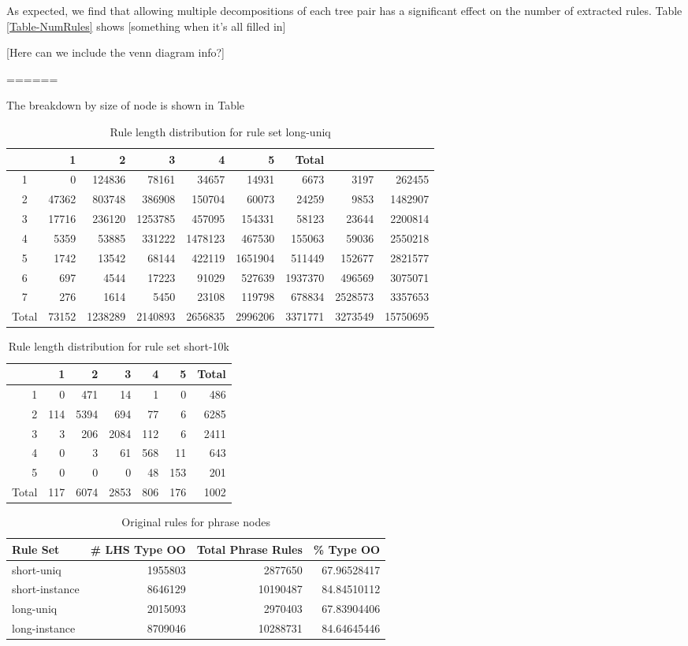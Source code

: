 \documentclass[11pt]{article}
\begin{document}
As expected, we find that allowing multiple decompositions of each tree pair has a significant effect on the number of extracted rules.  Table \ref{Table-NumRules} shows [something when it's all filled in]

[Here can we include the venn diagram info?]

======

The breakdown by size of node is shown in Table

\begin{table}
\begin{tabular}{c|rrrrrrr|r}
&1&2&3&4&5&Total\\
\hline
1&0&124836&78161&34657&14931&6673&3197&262455\\
2&47362&803748&386908&150704&60073&24259&9853&1482907\\
3&17716&236120&1253785&457095&154331&58123&23644&2200814\\
4&5359&53885&331222&1478123&467530&155063&59036&2550218\\
5&1742&13542&68144&422119&1651904&511449&152677&2821577\\
6&697&4544&17223&91029&527639&1937370&496569&3075071\\
7&276&1614&5450&23108&119798&678834&2528573&3357653\\
\hline
Total&73152&1238289&2140893&2656835&2996206&3371771&3273549&15750695\\
\end{tabular}
\caption{Rule length distribution for rule set long-uniq}
\end{table}

\begin{table}
\begin{tabular}{r|rrrrr|r}
&1&2&3&4&5&Total\\
\hline
1&0&471&14&1&0&486\\
2&114&5394&694&77&6&6285\\
3&3&206&2084&112&6&2411\\
4&0&3&61&568&11&643\\
5&0&0&0&48&153&201\\
\hline
Total&117&6074&2853&806&176&1002\\
\end{tabular}
\caption{Rule length distribution for rule set short-10k}
\end{table}

\begin{table}[tbh!]
  \begin{tabular}{lrrr}
  Rule Set & \# LHS Type OO & Total Phrase Rules & \% Type OO\\
  \hline
  short-uniq & 1955803 & 2877650 & 67.96528417\\
	short-instance & 8646129 & 10190487 & 84.84510112\\
	long-uniq	& 2015093 & 2970403	& 67.83904406\\
	long-instance & 8709046	& 10288731 & 84.64645446\\
  \end{tabular}
  \caption{Original rules for phrase nodes}
\end{table}
\end{document}
